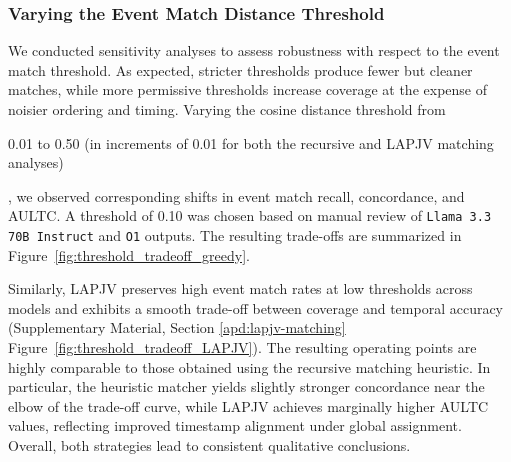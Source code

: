 \documentclass[pdflatex,sn-mathphys-num]{sn-jnl}%
\newif\ifshowrebuttalcolor
\newcommand{\rebuttal}[1]{%
  \ifshowrebuttalcolor
    \textcolor{rebuttalblue}{#1}%
  \else
    #1%
  \fi
}
\theoremstyle{thmstyleone}%
\theoremstyle{thmstyletwo}%
\theoremstyle{thmstylethree}%
\begin{document}
\subsubsection{Varying the Event Match Distance Threshold}

We conducted sensitivity analyses to assess robustness with respect to the event match threshold. As expected, stricter thresholds produce fewer but cleaner matches, while more permissive thresholds increase coverage at the expense of noisier ordering and timing. Varying the cosine distance threshold from \rebuttal{0.01 to 0.50 (in increments of 0.01 for both the recursive and LAPJV matching analyses)}, we observed corresponding shifts in event match recall, concordance, and AULTC. A threshold of 0.10 was chosen based on manual review of \texttt{Llama 3.3 70B Instruct} and \texttt{O1} outputs. The resulting trade-offs are summarized in Figure~\ref{fig:threshold_tradeoff_greedy}.



Similarly, LAPJV preserves high event match rates at low thresholds across models and exhibits a smooth trade-off between coverage and temporal accuracy (Supplementary Material, Section \ref{apd:lapjv-matching} Figure~\ref{fig:threshold_tradeoff_LAPJV}). The resulting operating points are highly comparable to those obtained using the recursive matching heuristic. In particular, the heuristic matcher yields slightly stronger concordance near the elbow of the trade-off curve, while LAPJV achieves marginally higher AULTC values, reflecting improved timestamp alignment under global assignment.  Overall, both strategies lead to consistent qualitative conclusions.
\end{document}
